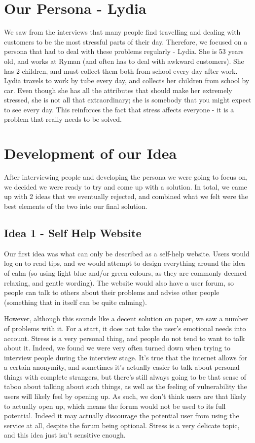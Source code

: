 \documentclass{scrartcl}
\begin{document}
\section{Our Persona - Lydia}
We saw from the interviews that many people find travelling and dealing with customers to be the most stressful parts of their day.
Therefore, we focused on a persona that had to deal with these problems regularly - Lydia. She is 53 years old, and works at Ryman
(and often has to deal with awkward customers). She has 2 children, and must collect them both from school every day after work.
Lydia travels to work by tube every day, and collects her children from school by car. Even though she has all the attributes that
should make her extremely stressed, she is not all that extraordinary; she is somebody that you might expect to see every day. This
reinforces the fact that stress affects everyone - it is a problem that really needs to be solved.

\section{Development of our Idea}
After interviewing people and developing the persona we were going to focus on, we decided we were ready to try and come up with
a solution. In total, we came up with 2 ideas that we eventually rejected, and combined what we felt were the best elements
of the two into our final solution.

\subsection{Idea 1 - Self Help Website}
Our first idea was what can only be described as a self-help website. Users would log on to read tips, and we would attempt to
design everything around the idea of calm (so using light blue and/or green colours, as they are commonly deemed relaxing,
and gentle wording). The website would also have a user forum, so people can talk to others about their problems and advise
other people (something that in itself can be quite calming).

However, although this sounds like a decent solution on paper, we saw a number of problems with it.
For a start, it does not take the user's emotional needs into account. Stress is a very personal thing, and people do not
tend to want to talk about it. Indeed, we found we were very often turned down when trying to interview people during the
interview stage. It's true that the internet allows for a certain anonymity, and sometimes it's actually easier to talk
about personal things with complete strangers, but there's still always going to be that sense of taboo about talking about
such things, as well as the feeling of vulnerability the users will likely feel by opening up. As such, we don't think users
are that likely to actually open up, which means the forum would not be used to its full potential. Indeed it may actually
discourage the potential user from using the service at all, despite the forum being optional. Stress is a very delicate
topic, and this idea just isn't sensitive enough.
\end{document}
